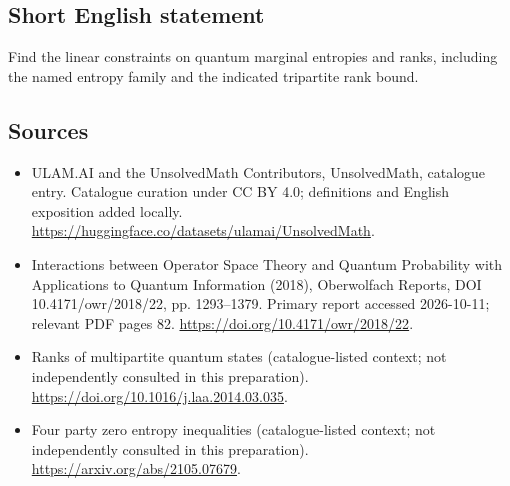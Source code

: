 \documentclass[11pt]{article}
\begin{document}
\subsection{Short English statement}
Find the linear constraints on quantum marginal entropies and ranks, including the named entropy family and the indicated tripartite rank bound.
\subsection{Sources}
\begin{itemize}
\item[\hypertarget{source:statement:1}{S1}] ULAM.AI and the UnsolvedMath Contributors, UnsolvedMath, catalogue entry. Catalogue curation under CC BY 4.0; definitions and English exposition added locally.
\url{https://huggingface.co/datasets/ulamai/UnsolvedMath}.
\item[\hypertarget{source:statement:2}{S2}] Interactions between Operator Space Theory and Quantum Probability with Applications to Quantum Information (2018), Oberwolfach Reports, DOI 10.4171/owr/2018/22, pp. 1293--1379. Primary report accessed 2026-10-11; relevant PDF pages 82.
\url{https://doi.org/10.4171/owr/2018/22}.
\item[\hypertarget{source:statement:3}{S3}] Ranks of multipartite quantum states (catalogue-listed context; not independently consulted in this preparation).
\url{https://doi.org/10.1016/j.laa.2014.03.035}.
\item[\hypertarget{source:statement:4}{S4}] Four party zero entropy inequalities (catalogue-listed context; not independently consulted in this preparation).
\url{https://arxiv.org/abs/2105.07679}.
\end{itemize}
\label{end:statement}
\end{document}
